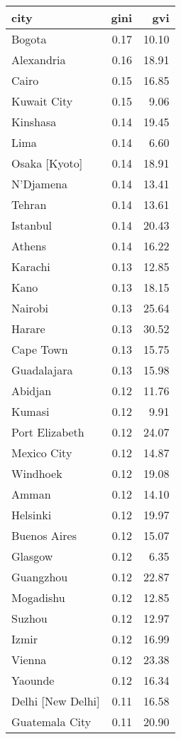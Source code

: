 \begin{longtable}{lrr}
  \hline
city & gini & gvi \\ 
  \hline
Bogota & 0.17 & 10.10 \\ 
  Alexandria & 0.16 & 18.91 \\ 
  Cairo & 0.15 & 16.85 \\ 
  Kuwait City & 0.15 & 9.06 \\ 
  Kinshasa & 0.14 & 19.45 \\ 
  Lima & 0.14 & 6.60 \\ 
  Osaka [Kyoto] & 0.14 & 18.91 \\ 
  N'Djamena & 0.14 & 13.41 \\ 
  Tehran & 0.14 & 13.61 \\ 
  Istanbul & 0.14 & 20.43 \\ 
  Athens & 0.14 & 16.22 \\ 
  Karachi & 0.13 & 12.85 \\ 
  Kano & 0.13 & 18.15 \\ 
  Nairobi & 0.13 & 25.64 \\ 
  Harare & 0.13 & 30.52 \\ 
  Cape Town & 0.13 & 15.75 \\ 
  Guadalajara & 0.13 & 15.98 \\ 
  Abidjan & 0.12 & 11.76 \\ 
  Kumasi & 0.12 & 9.91 \\ 
  Port Elizabeth & 0.12 & 24.07 \\ 
  Mexico City & 0.12 & 14.87 \\ 
  Windhoek & 0.12 & 19.08 \\ 
  Amman & 0.12 & 14.10 \\ 
  Helsinki & 0.12 & 19.97 \\ 
  Buenos Aires & 0.12 & 15.07 \\ 
  Glasgow & 0.12 & 6.35 \\ 
  Guangzhou & 0.12 & 22.87 \\ 
  Mogadishu & 0.12 & 12.85 \\ 
  Suzhou & 0.12 & 12.97 \\ 
  Izmir & 0.12 & 16.99 \\ 
  Vienna & 0.12 & 23.38 \\ 
  Yaounde & 0.12 & 16.34 \\ 
  Delhi [New Delhi] & 0.11 & 16.58 \\ 
  Guatemala City & 0.11 & 20.90 \\ 

\end{longtable}
